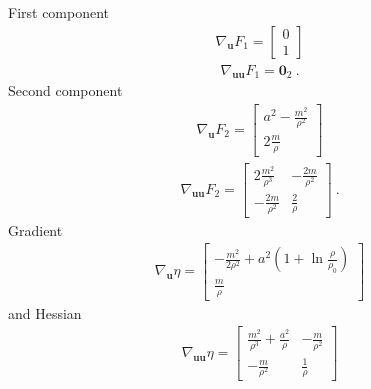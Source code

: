 \documentclass[letterpaper,10pt,english]{jupyterBook}
\begin{document}
\sphinxAtStartPar
{} First component
\begin{equation*}
\begin{split}\nabla_{\mathbf{u}} F_1 = \begin{bmatrix} 0 \\ 1 \end{bmatrix}\end{split}
\end{equation*}\begin{equation*}
\begin{split}\nabla_{\mathbf{u} \mathbf{u}} F_1 = \mathbf{0}_2 \ .\end{split}
\end{equation*}
\sphinxAtStartPar
Second component
\begin{equation*}
\begin{split}\nabla_{\mathbf{u}} F_2 = \begin{bmatrix} a^2 - \frac{m^2}{\rho^2} \\ 2 \frac{m}{\rho} \end{bmatrix}\end{split}
\end{equation*}\begin{equation*}
\begin{split}\nabla_{\mathbf{u} \mathbf{u}} F_2 = \begin{bmatrix} 2 \frac{m^2}{\rho^3} & - \frac{2 m}{\rho^2} \\ - \frac{2 m}{\rho^2} & \frac{2}{\rho} \end{bmatrix} \ .\end{split}
\end{equation*}
\sphinxAtStartPar
{} Gradient
\begin{equation*}
\begin{split}\nabla_{\mathbf{u}} \eta = \begin{bmatrix} - \frac{m^2}{2 \rho^2} + a^2\left( 1 + \ln \frac{\rho}{\rho_0} \right) \\ \frac{m}{\rho} \end{bmatrix}\end{split}
\end{equation*}
\sphinxAtStartPar
and Hessian
\begin{equation*}
\begin{split}\nabla_{\mathbf{u} \mathbf{u}} \eta = \begin{bmatrix}  \frac{m^2}{\rho^3} + \frac{a^2}{\rho} & - \frac{m}{\rho^2} \\ - \frac{m}{\rho^2} & \frac{1}{\rho} \end{bmatrix}\end{split}
\end{equation*}
\end{document}
